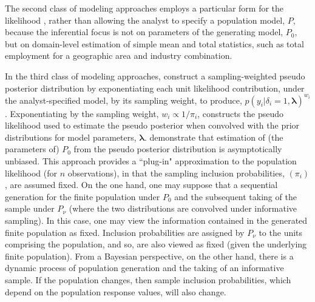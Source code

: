 \documentclass[]{imsart}
\begin{document}
The second class of modeling approaches employs a particular form for the likelihood \citep{dong:2014, kunihama:2014, wu:2010, si2015bayesian}, rather than allowing the analyst to specify a population model, $P$, because the inferential focus is not on parameters of the generating model, $P_{0}$, but on domain-level estimation of simple mean and total statistics, such as total employment for a geographic area and industry combination.

In the third class of modeling approaches, \citet{savitsky2016bayesian} construct a sampling-weighted pseudo posterior distribution by exponentiating each unit likelihood contribution, under the analyst-specified model, by its sampling weight, to produce, $p\left(y_{i}\vert \delta_{i} = 1,\bm{\lambda}\right)^{w_{i}}$.  Exponentiating by the sampling weight, $w_{i} \propto 1/\pi_{i}$, constructs the pseudo likelihood used to estimate the pseudo posterior when convolved with the prior distributions for model parameters, $\bm{\lambda}$. \citet{savitsky2016bayesian} demonstrate that estimation of (the parameters of) $P_{0}$ from the pseudo posterior distribution is asymptotically unbiased.  This approach provides a ``plug-in" approximation to the population likelihood (for $n$ observations), in that the sampling inclusion probabilities, $(\pi_{i})$, are assumed fixed.  On the one hand, one may suppose that a sequential generation for the finite population under $P_{0}$ and the subsequent taking of the sample under $P_{\nu}$ (where the two distributions are convolved under informative sampling).  In this case, one may view the information contained in the generated finite population as fixed.  Inclusion probabilities are assigned by $P_{\nu}$ to the units comprising the population, and so, are also viewed as fixed (given the underlying finite population).  From a Bayesian perspective, on the other hand, there is a dynamic process of population generation and the taking of an informative sample.  If the population changes, then sample inclusion probabilities, which depend on the population response values, will also change.
\end{document}
